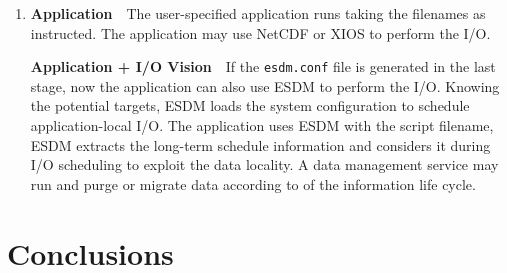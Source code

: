 \documentclass[a4paper]{article}
\begin{document}
\begin{enumerate}
  \item \textbf{Application}\ \ The user-specified application runs taking the filenames as instructed. The application may use NetCDF or XIOS to perform the I/O.

  \textbf{Application + I/O Vision}\ \ If the \texttt{esdm.conf} file is generated in the last stage, now the application can also use ESDM to perform the I/O. Knowing the potential targets, ESDM loads the system configuration to schedule application-local I/O. The application uses ESDM with the script filename, ESDM extracts the long-term schedule information and considers it during I/O scheduling to exploit the data locality. A data management service may run and purge or migrate data according to \sout{{\color{blue}{user-specifications}}} {\color{cyan}{user or ESDM specifications}} of the information life cycle.

\end{enumerate}

\section{Conclusions}
\label{sec:conclusions}
\end{document}
